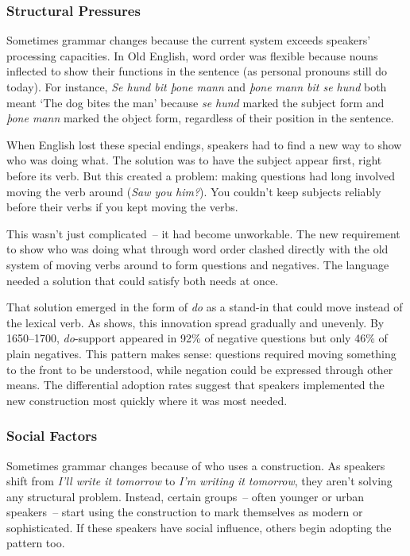 \subsubsection{Structural Pressures} 
Sometimes grammar changes because the current system exceeds speakers' processing capacities. In Old English, word order was flexible because nouns inflected to show their functions in the sentence (as personal pronouns still do today). For instance, \textit{Se hund bit þone mann} and \textit{þone mann bit se hund} both meant `The dog bites the man' because \textit{se hund} marked the subject form and \textit{þone mann} marked the object form, regardless of their position in the sentence.

When English lost these special endings, speakers had to find a new way to show who was doing what. The solution was to have the subject appear first, right before its verb. But this created a problem: making questions had long involved moving the verb around (\textit{Saw you him?}). You couldn't keep subjects reliably before their verbs if you kept moving the verbs.

This wasn't just complicated~-- it had become unworkable. The new requirement to show who was doing what through word order clashed directly with the old system of moving verbs around to form questions and negatives. The language needed a solution that could satisfy both needs at once.

That solution emerged in the form of \textit{do} as a stand-in that could move instead of the lexical verb. As \citet{culicover2008rise} shows, this innovation spread gradually and unevenly. By 1650--1700, \textit{do}-support appeared in 92\% of negative questions but only 46\% of plain negatives. This pattern makes sense: questions required moving something to the front to be understood, while negation could be expressed through other means. The differential adoption rates suggest that speakers implemented the new construction most quickly where it was most needed.

\subsubsection{Social Factors}
Sometimes grammar changes because of who uses a construction. As speakers shift from \textit{I'll write it tomorrow} to \textit{I'm writing it tomorrow}, they aren't solving any structural problem. Instead, certain groups~-- often younger or urban speakers~-- start using the construction to mark themselves as modern or sophisticated. If these speakers have social influence, others begin adopting the pattern too.

